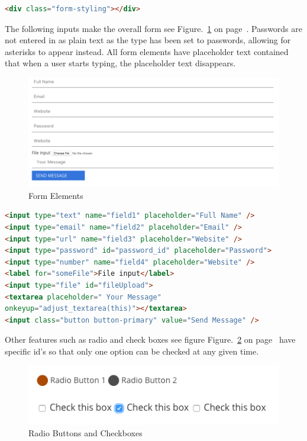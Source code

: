 \begin{lstlisting}[language=HTML]
<div class="form-styling"></div>
\end{lstlisting}

The following inputs make the overall form see Figure.~\ref{fig:form} on  page~\pageref{fig:form}. Passwords are not entered in as plain text as the type has been set to passwords, allowing for asterisks to appear instead. All form elements have placeholder text contained that when a user starts typing, the placeholder text disappears.

\begin{figure}[h]
\centering
\includegraphics[scale=0.3]{images/form}
\caption{Form Elements}
  \label{fig:form}
\end{figure}


\begin{lstlisting}[language=HTML]
<input type="text" name="field1" placeholder="Full Name" />
<input type="email" name="field2" placeholder="Email" />
<input type="url" name="field3" placeholder="Website" />
<input type="password" id="password_id" placeholder="Password">
<input type="number" name="field4" placeholder="Website" />
<label for="someFile">File input</label>
<input type="file" id="fileUpload">
<textarea placeholder=" Your Message" 
onkeyup="adjust_textarea(this)"></textarea>
<input class="button button-primary" value="Send Message" />
\end{lstlisting}

Other features such as radio and check boxes see figure Figure.~\ref{fig:radio} on  page~\pageref{fig:radio} have specific id's so that only one option can be checked at any given time. 

\begin{figure}[h]
\centering
\includegraphics[scale=0.4]{images/radio}
\caption{Radio Buttons and Checkboxes}
  \label{fig:radio}
\end{figure}

